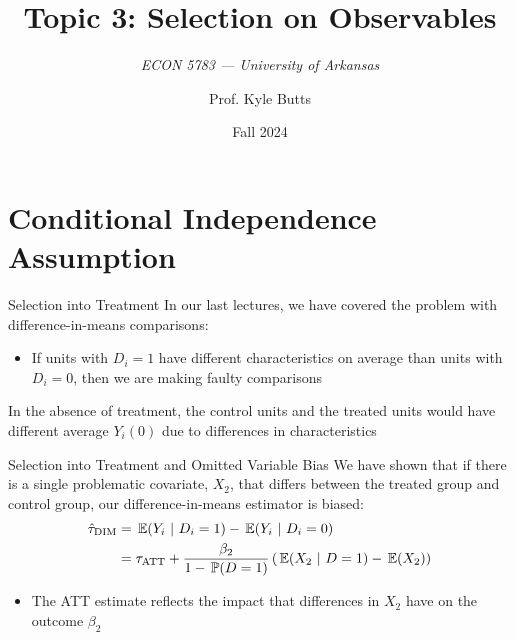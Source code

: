 \documentclass[aspectratio=169,t,11pt,table]{beamer}
\title{Topic 3: Selection on Observables}
\subtitle{\it  ECON 5783 — University of Arkansas}
\date{Fall 2024}
\author{Prof. Kyle Butts}
\begin{document}
\begin{frame}
\maketitle

\end{frame}

\section{Conditional Independence Assumption}

\begin{frame}{Selection into Treatment}
  In our last lectures, we have covered the problem with difference-in-means comparisons:
  \begin{itemize}
    \item If units with $D_i = 1$ have different characteristics on average than units with $D_i = 0$, then we are making faulty comparisons
  \end{itemize}

  \pause
  \bigskip
  In the absence of treatment, the control units and the treated units would have different average $Y_i(0)$ due to differences in characteristics
\end{frame}

\begin{frame}{Selection into Treatment and Omitted Variable Bias}
  We have shown that if there is a single problematic covariate, $X_2$, that differs between the treated group and control group, our difference-in-means estimator is biased:
  \begin{align*}
    \hat{\tau}_{\text{DIM}} &= 
    \expec{Y_{i}}{D_i = 1} - \expec{Y_{i}}{D_i = 0} \\
    &= \tau_{\text{ATT}} + \frac{\beta_2}{1 - \prob{D = 1}} \left( \expec{X_2}{D = 1} - \expec{X_2} \right)
  \end{align*}

  \pause
  \begin{itemize}
    \item The ATT estimate reflects the impact that differences in $X_2$ have on the outcome $\beta_2$
  \end{itemize}
\end{frame}
\end{document}

